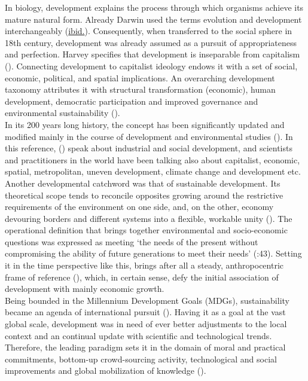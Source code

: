 \documentclass[11pt]{report}
\begin{document}
In biology, development explains the process through which organisms achieve its mature natural form.
Already Darwin used the terms evolution and development interchangeably (\href{Esteva}{ibid.}).
Consequently, when transferred to the social sphere in 18th century, development was already assumed as a pursuit of appropriateness and perfection.
Harvey specifies that development is inseparable from capitalism (\href{Harvey}{\citealt{harvey_urban_1978}}).
Connecting development to capitalist ideology endows it with a set of social, economic, political, and spatial implications.
An overarching development taxonomy attributes it with structural transformation (economic), human development, democratic participation and improved governance and environmental sustainability (\href{Vázquez}{\citealt{vazquez_revisiting_2013}}).
\\

In its 200 years long history, the concept has been significantly updated and modified mainly in the course of development and environmental studies (\href{Vujosevic}{\citealt{vujosevic_novi_2012}}). 
In this reference, (\href{Walker}{\citealt{walker_capitalist_1989}}) speak about industrial and social development, and scientists and practitioners in the world have been talking also about capitalist, economic, spatial, metropolitan, uneven development, climate change and development etc.
Another developmental catchword was that of sustainable development.
Its theoretical scope tends to reconcile opposites growing around the restrictive requirements of the environment on one side, and, on the other, economy devouring borders and different systems into a flexible, workable unity (\href{ref}{\citealt{bolay_what_2012}}).
The operational definition that brings together environmental and socio-economic questions was expressed as meeting ‘the needs of the present without compromising the ability of future generations to meet their needs’ (\href{WCED}{\citealt{WCED1987????????}}:43).
Setting it in the time perspective like this, brings after all a steady, anthropocentric frame of reference (\href{Lee}{\citealt{lee_global_2000}}), which, in certain sense, defy the initial association of development with mainly economic growth.
\\

Being bounded in the Millennium Development Goals (MDGs), sustainability became an agenda of international pursuit (\href{MDG}{\citealt{MDG ??????}}).
Having it as a goal at the vast global scale, development was in need of ever better adjustments to the local context and an continual update with scientific and technological trends.
Therefore, the leading paradigm sets it in the domain of moral and practical commitments, bottom-up crowd-sourcing activity, technological and social improvements and global mobilization of knowledge (\href{Sachs}{\citealt{Sachs2012????}}).
\\
\end{document}
